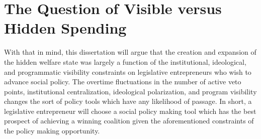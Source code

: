 \documentclass[12pt]{article}
\begin{document}
\section{The Question of Visible versus Hidden Spending}
With that in mind, this dissertation will argue that the creation and expansion of the hidden welfare state was largely a function of the institutional, ideological, and programmatic visibility constraints on legislative entrepreneurs who wish to advance social policy. The overtime fluctuations in the number of active veto points, institutional centralization, ideological polarization, and program visibility changes the sort of policy tools which have any likelihood of passage. In short, a legislative entrepreneur will choose a social policy making tool which has the best prospect of achieving a winning coalition given the aforementioned constraints of the policy making opportunity.
\end{document}
